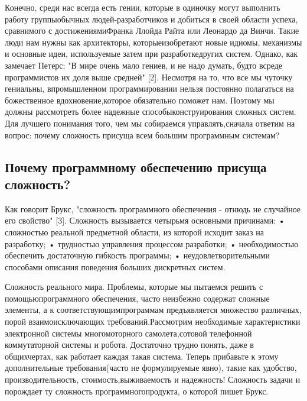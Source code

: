 \documentclass[10pt]{article}
\begin{document}
Конечно, среди нас всегда есть гении, которые в одиночку могут выполнить работу группы\linebreak  обычных людей-разработчиков и добиться в своей области успеха, сравнимого с достижениями\linebreak  Франка Ллойда Райта или Леонардо да Винчи. Такие люди нам нужны как архитекторы, которые\linebreak  изобретают новые идиомы, механизмы и основные идеи, используемые затем при разработке\linebreak  других систем. Однако, как замечает Петерс: "В мире очень мало гениев, и не надо думать, будто в\linebreak  среде программистов их доля выше средней" [2]. Несмотря на то, что все мы чуточку гениальны, в\linebreak  промышленном программировании нельзя постоянно полагаться на божественное вдохновение,\linebreak  которое обязательно поможет нам. Поэтому мы должны рассмотреть более надежные способы\linebreak  конструирования сложных систем. Для лучшего понимания того, чем мы собираемся управлять,\linebreak  сначала ответим на вопрос: почему сложность присуща всем большим программным системам? 
\subsection{Почему программному обеспечению присуща сложность?}
Как говорит Брукс, "сложность программного обеспечения - отнюдь не случайное его свойство" [3]. Сложность вызывается четырьмя основными причинами: 
•	сложностью реальной предметной области, из которой исходит заказ на разработку;
•	трудностью управления процессом разработки;
•	необходимостью обеспечить достаточную гибкость программы;
•	неудовлетворительными способами описания поведения больших дискретных систем.

Сложность реального мира. Проблемы, которые мы пытаемся решить с помощью\linebreak  программного обеспечения, часто неизбежно содержат сложные элементы, а к соответствующим\linebreak  программам предъявляется множество различных, порой взаимоисключающих требований.\linebreak  Рассмотрим необходимые характеристики электронной системы многомоторного самолета,\linebreak  сотовой телефонной коммутаторной системы и робота. Достаточно трудно понять, даже в общих\linebreak  чертах, как работает каждая такая система. Теперь прибавьте к этому дополнительные требования\linebreak  (часто не формулируемые явно), такие как удобство, производительность, стоимость,\linebreak  выживаемость и надежность! Сложность задачи и порождает ту сложность программного\linebreak  продукта, о которой пишет Брукс. 
\end{document}
